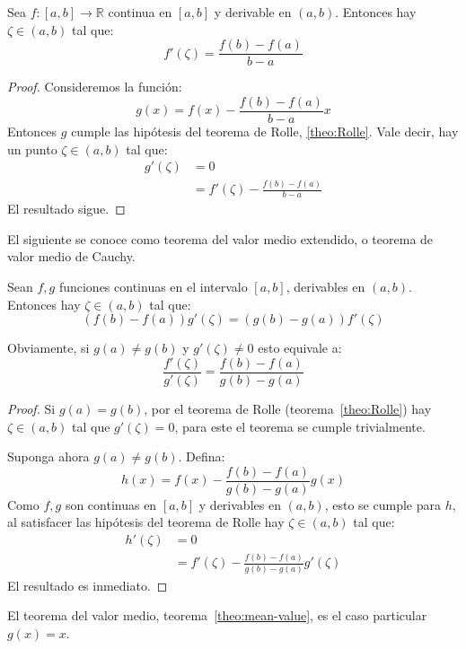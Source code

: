   \begin{theorem}
    \label{theo:mean-value}
    Sea \(f \colon [a, b] \to \mathbb{R}\) continua en \([a, b]\)
    y derivable en \((a, b)\).
    Entonces hay \(\zeta \in (a, b)\) tal que:
    \begin{equation*}
      f'(\zeta)
        = \frac{f(b) - f(a)}{b - a}
    \end{equation*}
  \end{theorem}
  \begin{proof}
    Consideremos la función:
    \begin{equation*}
      g(x)
        = f(x) - \frac{f(b) - f(a)}{b - a} x
    \end{equation*}
    Entonces \(g\) cumple las hipótesis del teorema de Rolle,
    \ref{theo:Rolle}.
    Vale decir,
    hay un punto \(\zeta \in (a, b)\) tal que:
    \begin{align*}
      g'(\zeta)
        &= 0 \\
        &= f'(\zeta) - \frac{f(b) - f(a)}{b - a}
    \end{align*}
    El resultado sigue.
  \end{proof}
  El siguiente se conoce como teorema del valor medio extendido,
  o teorema de valor medio de Cauchy.
  \begin{theorem}
    \label{theo:mean-value-extended}
    Sean \(f, g\) funciones continuas en el intervalo \([a, b]\),
    derivables en \((a, b)\).
    Entonces hay \(\zeta \in (a, b)\) tal que:
    \begin{equation*}
      (f(b) - f(a)) g'(\zeta)
        = (g(b) - g(a)) f'(\zeta)
    \end{equation*}
  \end{theorem}
  Obviamente,
  si \(g(a) \ne g(b)\) y \(g'(\zeta) \ne 0\) esto equivale a:
  \begin{equation*}
    \frac{f'(\zeta)}{g'(\zeta)}
      = \frac{f(b) - f(a)}{g(b) - g(a)}
  \end{equation*}
  \begin{proof}
    Si \(g(a) = g(b)\),
    por el teorema de Rolle
    (teorema~\ref{theo:Rolle})
    hay \(\zeta \in (a, b)\) tal que \(g'(\zeta) = 0\),
    para este el teorema se cumple trivialmente.

    Suponga ahora \(g(a) \ne g(b)\).
    Defina:
    \begin{equation*}
      h(x)
        = f(x) - \frac{f(b) - f(a)}{g(b) - g(a)} g(x)
    \end{equation*}
    Como \(f, g\) son continuas en \([a, b]\) y derivables en \((a, b)\),
    esto se cumple para \(h\),
    al satisfacer las hipótesis del teorema de Rolle
    hay \(\zeta \in (a, b)\) tal que:
    \begin{align*}
      h'(\zeta)
        &= 0 \\
        &= f'(\zeta) - \frac{f(b) - f(a)}{g(b) - g(a)} g'(\zeta)
    \end{align*}
    El resultado es inmediato.
  \end{proof}
  El teorema del valor medio,
  teorema~\ref{theo:mean-value},
  es el caso particular \(g(x) = x\).

